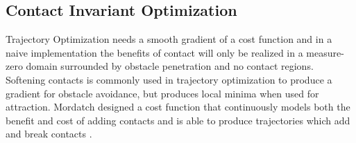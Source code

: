 \documentclass[../thesis.tex]{subfiles}
\begin{document}
\subsection{Contact Invariant Optimization}
Trajectory Optimization needs a smooth gradient of a cost function and in a naive implementation the benefits of contact will only be realized in a measure-zero domain surrounded by obstacle penetration and no contact regions.
Softening contacts is commonly used in trajectory optimization to produce a gradient for obstacle avoidance, but produces local minima when used for attraction.
Mordatch designed a cost function that continuously models both the benefit and cost of adding contacts and is able to produce trajectories which add and break contacts \cite{Mordatch2012}. 
\end{document}
